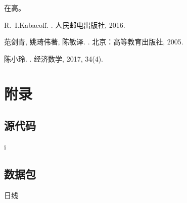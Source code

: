 \documentclass[10pt]{ctexart}
\begin{document}
	在高。
	
	
\begin{thebibliography}{1}		
		
R.~I.Kabacoff.
.
\newblock 人民邮电出版社, 2016.


范剑青, 姚琦伟著, 陈敏译.
.
\newblock  北京：高等教育出版社, 2005.
		
		
陈小玲.
.
\newblock 经济数学, 2017, 34(4).

\end{thebibliography}
	
	
	\section{附录}
	
	\subsection{源代码}
	
		i
	
	
	\subsection{数据包}
	
	日线
	

	
	
\end{document}
